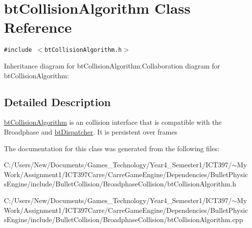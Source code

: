 \hypertarget{classbt_collision_algorithm}{
\section{btCollisionAlgorithm Class Reference}
\label{classbt_collision_algorithm}
}
{\tt \#include $<$btCollisionAlgorithm.h$>$}

Inheritance diagram for btCollisionAlgorithm:Collaboration diagram for btCollisionAlgorithm:

\subsection{Detailed Description}
\hyperlink{classbt_collision_algorithm}{btCollisionAlgorithm} is an collision interface that is compatible with the Broadphase and \hyperlink{classbt_dispatcher}{btDispatcher}. It is persistent over frames 

The documentation for this class was generated from the following files:\begin{CompactItemize}
\item 
C:/Users/New/Documents/Games\_\-Technology/Year4\_\-Semester1/ICT397/$\sim$My Work/Assignment1/ICT397Carre/CarreGameEngine/Dependencies/BulletPhysicsEngine/include/BulletCollision/BroadphaseCollision/btCollisionAlgorithm.h\item 
C:/Users/New/Documents/Games\_\-Technology/Year4\_\-Semester1/ICT397/$\sim$My Work/Assignment1/ICT397Carre/CarreGameEngine/Dependencies/BulletPhysicsEngine/include/BulletCollision/BroadphaseCollision/btCollisionAlgorithm.cpp\end{CompactItemize}
